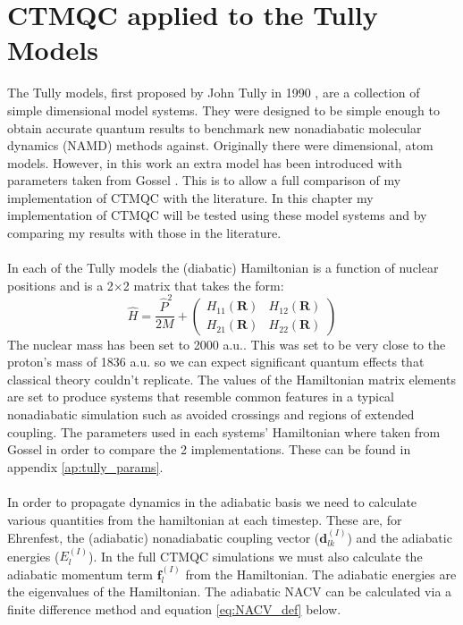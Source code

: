 \chapter{CTMQC applied to the Tully Models}
\label{chap:tully_models}

The Tully models, first proposed by John Tully in 1990 \cite{tully_molecular_1990}, are a collection of simple  dimensional model systems. They were designed to be simple enough to obtain accurate quantum results to benchmark new nonadiabatic molecular dynamics (NAMD) methods against. Originally there were  dimensional,  atom models. However, in this work an extra model has been introduced with parameters taken from Gossel \cite{gossel_coupled-trajectory_2018}. This is to allow a full comparison of my implementation of CTMQC with the literature. In this chapter my implementation of CTMQC will be tested using these model systems and by comparing my results with those in the literature.
\\\\
In each of the Tully models the (diabatic) Hamiltonian is a function of nuclear positions  and is a 2$\times$2 matrix that takes the form:
\begin{equation}
  \hat{H} = \frac{\ \hat{P} ^2}{2M} + \left(
                                              \begin{array}{cc}
                                                H_{11}(\mathbf{R}) & H_{12}(\mathbf{R}) \\
                                                H_{21}(\mathbf{R}) & H_{22}(\mathbf{R})
                                              \end{array}
                                         \right)
\end{equation}
The nuclear mass has been set to 2000 a.u.. This was set to be very close to the proton's mass of 1836 a.u. so we can expect significant quantum effects that classical theory couldn't replicate. The values of the Hamiltonian matrix elements are set to produce systems that resemble common features in a typical nonadiabatic simulation such as avoided crossings and regions of extended coupling. The parameters used in each systems' Hamiltonian where taken from Gossel \cite{gossel_coupled-trajectory_2018} in order to compare the 2 implementations. These can be found in appendix \ref{ap:tully_params}.
\\\\
In order to propagate dynamics in the adiabatic basis we need to calculate various quantities from the hamiltonian at each timestep. These are, for Ehrenfest, the (adiabatic) nonadiabatic coupling vector ($\mathbf{d}_{lk}^{(I)}$) and the adiabatic energies ($E_{l}^{(I)}$). In the full CTMQC simulations we must also calculate the adiabatic momentum term $\mathbf{f}_{l}^{(I)}$ from the Hamiltonian. The adiabatic energies are the eigenvalues of the Hamiltonian. The adiabatic NACV can be calculated via a finite difference method and equation \eqref{eq:NACV_def} below.
